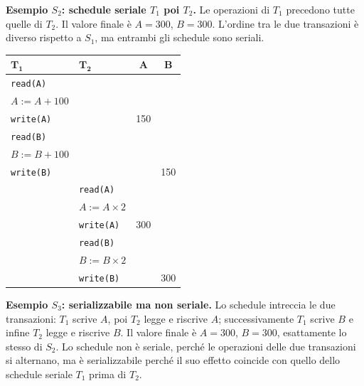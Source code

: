 \documentclass[12pt]{extarticle}
\begin{document}
\medskip
\noindent \textbf{Esempio $S_2$: schedule seriale $T_1$ poi $T_2$.} Le operazioni di $T_1$ precedono tutte quelle di $T_2$. Il valore finale è $A=300$, $B=300$. L'ordine tra le due transazioni è diverso rispetto a $S_1$, ma entrambi gli schedule sono seriali.

\begin{center}
\small
\begin{tabular}{@{}llcc@{}}
    \toprule
    $\boldsymbol{T_1}$ & $\boldsymbol{T_2}$ & $\boldsymbol{A}$ & $\boldsymbol{B}$ \\
    \midrule
    \texttt{read(A)}       &      &      &      \\
    $A := A + 100$         &      &      &      \\
    \texttt{write(A)}      &      & 150  &      \\
    \texttt{read(B)}       &      &      &      \\
    $B := B + 100$         &      &      &      \\
    \texttt{write(B)}      &      &      & 150  \\
     & \texttt{read(A)}       &      &      \\
     & $A := A \times 2$      &      &      \\
     & \texttt{write(A)}      & 300  &      \\
     & \texttt{read(B)}       &      &      \\
     & $B := B \times 2$      &      &      \\
     & \texttt{write(B)}      &      & 300  \\
    \bottomrule
\end{tabular}
\end{center}

\medskip
\noindent \textbf{Esempio $S_3$: serializzabile ma non seriale.} Lo schedule intreccia le due transazioni: $T_1$ scrive $A$, poi $T_2$ legge e riscrive $A$; successivamente $T_1$ scrive $B$ e infine $T_2$ legge e riscrive $B$. Il valore finale è $A=300$, $B=300$, esattamente lo stesso di $S_2$. Lo schedule non è seriale, perché le operazioni delle due transazioni si alternano, ma è serializzabile perché il suo effetto coincide con quello dello schedule seriale $T_1$ prima di $T_2$.
\end{document}
